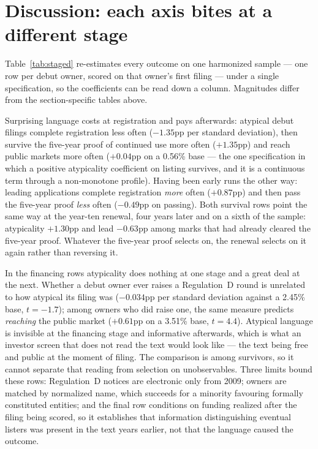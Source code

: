 \section{Discussion: each axis bites at a different stage}\label{sec:discussion}

Table~\ref{tab:staged} re-estimates every outcome on one harmonized
sample --- one row per debut owner, scored on that owner's first filing
--- under a single specification, so the coefficients can be read down a
column. Magnitudes differ from the section-specific tables above.



Surprising language costs at registration and pays afterwards: atypical
debut filings complete registration less often ($-1.35$pp per standard
deviation), then survive the five-year proof of continued use more often
($+1.35$pp) and reach public markets more often ($+0.04$pp on a 0.56\%
base --- the one specification in which a positive atypicality
coefficient on listing survives, and it is a continuous term through a
non-monotone profile). Having been early runs the other way: leading
applications complete registration \emph{more} often ($+0.87$pp) and then
pass the five-year proof \emph{less} often ($-0.49$pp on passing). Both
survival rows point the same way at the year-ten renewal, four years
later and on a sixth of the sample: atypicality $+1.30$pp and lead
$-0.63$pp among marks that had already cleared the five-year proof.
Whatever the five-year proof selects on, the renewal selects on it again
rather than reversing it.

In the financing rows atypicality does nothing at one stage and a great
deal at the next. Whether a debut owner ever raises a Regulation~D round
is unrelated to how atypical its filing was ($-0.034$pp per standard
deviation against a 2.45\% base, $t = -1.7$); among owners who did raise
one, the same measure predicts \emph{reaching} the public market
($+0.61$pp on a 3.51\% base, $t = 4.4$). Atypical language is invisible
at the financing stage and informative afterwards, which is what an
investor screen that does not read the text would look like --- the text
being free and public at the moment of filing. The comparison is among
survivors, so it cannot separate that reading from selection on
unobservables. Three limits bound these rows: Regulation~D notices are
electronic only from 2009; owners are matched by normalized name, which
succeeds for a minority favouring formally constituted entities; and the
final row conditions on funding realized after the filing being scored,
so it establishes that information distinguishing eventual listers was
present in the text years earlier, not that the language caused the
outcome.

